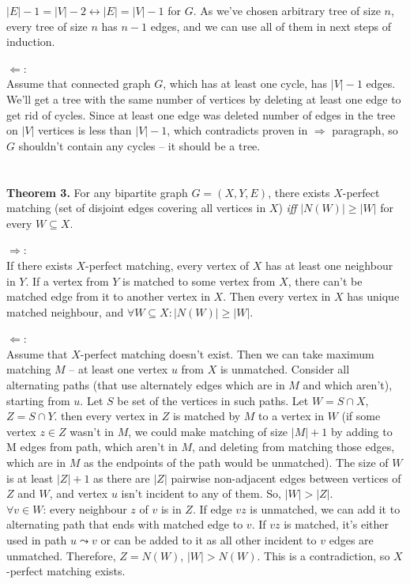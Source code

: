 \documentclass{article}
\begin{document}
	$|E| - 1 = |V| - 2 \leftrightarrow |E| = |V| - 1$ for $G$. As we've chosen arbitrary tree of size $n$, every tree of size $n$ has $n - 1$ edges, and we can use all of them in next steps of induction.\par
	$\Longleftarrow$:\\
	Assume that connected graph $G$, which has at least one cycle, has $|V| - 1$ edges. We'll get a tree with the same number of vertices by deleting at least one edge to get rid of cycles. Since at least one edge was deleted number of edges in the tree on $|V|$ vertices is less than $|V| - 1$, which contradicts proven in  $\Longrightarrow$ paragraph, so $G$ shouldn't contain any cycles -- it should be a tree.\\\\\\
	\textbf{Theorem 3.} For any bipartite graph $G = (X,Y,E)$, there exists $X$-perfect matching (set of disjoint edges covering all vertices in $X$) \textit{iff} $|N(W)| \geq |W| $ for every $W \subseteq X$.\par
	$\Longrightarrow$:\\
	If there exists $X$-perfect matching, every vertex of $X$ has at least one neighbour in $Y$. If a vertex from $Y$ is matched to some vertex from $X$, there can't be matched edge from it to another vertex in $X$. Then every vertex in $X$ has unique matched neighbour, and $\forall W \subseteq X: |N(W)| \geq |W|$.\par 
	$\Longleftarrow$:\\
	Assume that $X$-perfect matching doesn't exist. Then we can take maximum matching $M$ -- at least one vertex $u$ from $X$ is unmatched. Consider all alternating paths (that use alternately edges which are in $M$ and which aren't), starting from $u$. Let $S$ be set of the vertices in such paths. Let $W = S \cap X$, $Z = S \cap Y$. then every vertex in $Z$ is matched by $M$ to a vertex in $W$ (if some vertex $z \in Z$ wasn't in $M$, we could make matching of size $|M| + 1$ by adding to M edges from path, which aren't in $M$, and deleting from matching those edges, which are in $M$ as the endpoints of the path would be unmatched). The size of $W$ is at least $|Z| + 1$ as there are $|Z|$ pairwise non-adjacent edges between vertices of $Z$ and $W$, and vertex $u$ isn't incident to any of them. So, $|W| > |Z|$.\\
	$\forall v \in W$: every neighbour $z$ of $v$ is in $Z$. If edge $vz$ is unmatched, we can add it to alternating path that ends with matched edge to $v$. If $vz$ is matched, it's either used in path $u \leadsto v$ or can be added to it as all other incident to $v$ edges are unmatched. Therefore, $Z = N(W)$, $|W| > N(W)$. This is a contradiction, so $X$-perfect matching exists.\\\\
\end{document}
